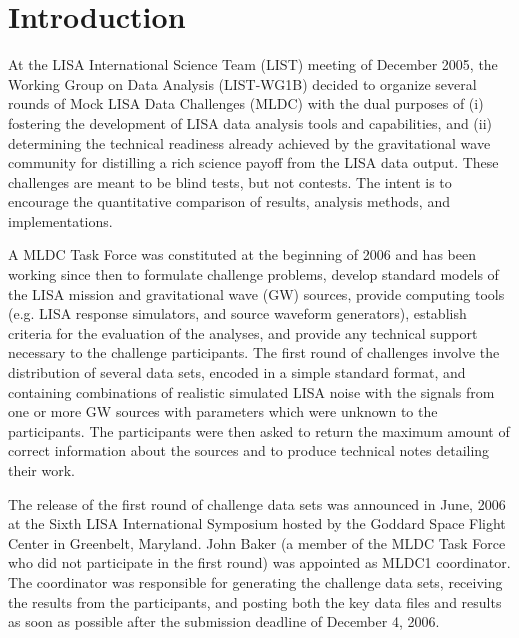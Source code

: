 \documentclass[12pt]{iopart}
\begin{document}

\section{Introduction}

At the LISA International Science Team (LIST) meeting of December 2005, the Working Group on Data Analysis (LIST-WG1B) decided to organize several rounds of Mock LISA Data Challenges (MLDC) with the dual purposes of (i) fostering the development of LISA data analysis tools and capabilities, and (ii) determining the technical readiness already achieved by the gravitational wave community for distilling a rich science payoff from the LISA data output. These challenges are meant to be blind tests, but not contests. The intent is to encourage the quantitative comparison of results, analysis methods, and implementations.

A MLDC Task Force was constituted at the beginning of 2006 and has been working since then to formulate challenge problems, develop standard models of the LISA mission and gravitational wave (GW) sources, provide computing tools (e.g. LISA response simulators, and source waveform generators), establish criteria for the evaluation of the analyses, and provide any technical support necessary to the challenge participants. The first round of challenges involve the distribution of several data sets, encoded in a simple standard format, and containing combinations of realistic simulated LISA noise with the signals from one or more GW sources with parameters which were unknown to the participants. The participants were then asked to return the maximum amount of correct information about the sources and to produce technical notes detailing their work.

The release of the first round of challenge data sets was announced in June, 2006 at the Sixth LISA International Symposium hosted by the Goddard Space Flight Center in Greenbelt, Maryland. John Baker (a member of the MLDC Task Force who did not participate in the first round) was appointed as MLDC1 coordinator. The coordinator was responsible for generating the challenge data sets, receiving the results from the participants, and posting both the key data files and results as soon as possible after the submission deadline of December 4, 2006.
\end{document}
